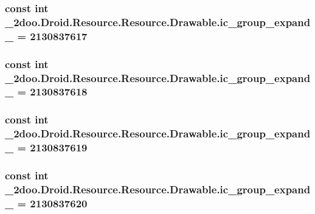 \hypertarget{class__2doo_1_1_droid_1_1_resource_1_1_drawable_c932843ba1a6cc7d8bc4bd90135c226c}{
\subsubsection[{ic\_\-group\_\-expand\_\-02}]{\setlength{\rightskip}{0pt plus 5cm}const int \_\-2doo.Droid.Resource.Resource.Drawable.ic\_\-group\_\-expand\_ = 2130837617}}
\label{class__2doo_1_1_droid_1_1_resource_1_1_drawable_c932843ba1a6cc7d8bc4bd90135c226c}


\hypertarget{class__2doo_1_1_droid_1_1_resource_1_1_drawable_9209cdac2702f44a7e2e9556fadfff48}{
\subsubsection[{ic\_\-group\_\-expand\_\-03}]{\setlength{\rightskip}{0pt plus 5cm}const int \_\-2doo.Droid.Resource.Resource.Drawable.ic\_\-group\_\-expand\_ = 2130837618}}
\label{class__2doo_1_1_droid_1_1_resource_1_1_drawable_9209cdac2702f44a7e2e9556fadfff48}


\hypertarget{class__2doo_1_1_droid_1_1_resource_1_1_drawable_06c2c759738ab4e819305fd66b2b8e48}{
\subsubsection[{ic\_\-group\_\-expand\_\-04}]{\setlength{\rightskip}{0pt plus 5cm}const int \_\-2doo.Droid.Resource.Resource.Drawable.ic\_\-group\_\-expand\_ = 2130837619}}
\label{class__2doo_1_1_droid_1_1_resource_1_1_drawable_06c2c759738ab4e819305fd66b2b8e48}


\hypertarget{class__2doo_1_1_droid_1_1_resource_1_1_drawable_ef7741c26a69ac38c33b95d38920068e}{
\subsubsection[{ic\_\-group\_\-expand\_\-05}]{\setlength{\rightskip}{0pt plus 5cm}const int \_\-2doo.Droid.Resource.Resource.Drawable.ic\_\-group\_\-expand\_ = 2130837620}}
\label{class__2doo_1_1_droid_1_1_resource_1_1_drawable_ef7741c26a69ac38c33b95d38920068e}


